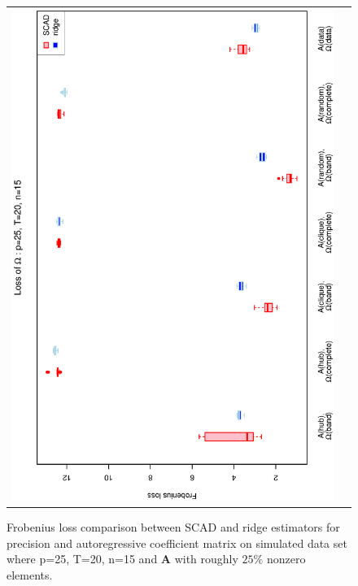 \documentclass[a4paper]{article}
\begin{document}
\begin{figure}[h!]
\begin{tabular}{cc}
\includegraphics[scale=0.45,angle=270]{LossOmega25T20N15_25.eps}
\end{tabular}
\caption{Frobenius loss comparison between SCAD and ridge estimators for precision and autoregressive coefficient matrix on simulated data set where p=25, T=20, n=15  and $\mathbf{A}$ with roughly $25\%$ nonzero elements.}
\label{figSM:Loss25T20N15_25}
\end{figure}


\end{document}
